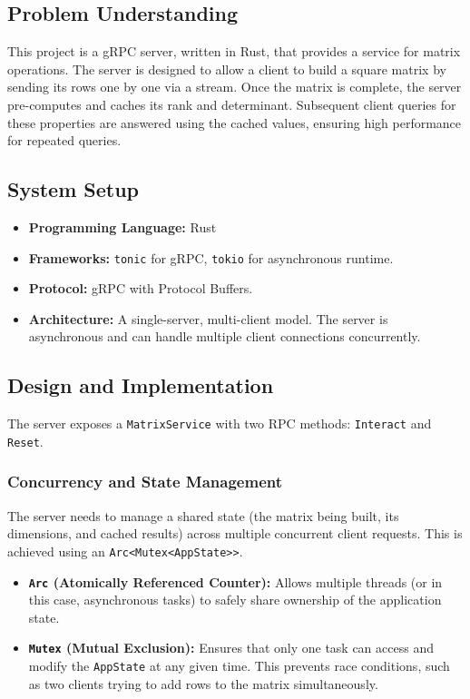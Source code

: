 \documentclass{article}
\begin{document}
\subsection{Problem Understanding}
This project is a gRPC server, written in Rust, that provides a service for matrix operations. The server is designed to allow a client to build a square matrix by sending its rows one by one via a stream. Once the matrix is complete, the server pre-computes and caches its rank and determinant. Subsequent client queries for these properties are answered using the cached values, ensuring high performance for repeated queries.

\subsection{System Setup}
\begin{itemize}
    \item \textbf{Programming Language:} Rust
    \item \textbf{Frameworks:} \texttt{tonic} for gRPC, \texttt{tokio} for asynchronous runtime.
    \item \textbf{Protocol:} gRPC with Protocol Buffers.
    \item \textbf{Architecture:} A single-server, multi-client model. The server is asynchronous and can handle multiple client connections concurrently.
\end{itemize}

\subsection{Design and Implementation}
The server exposes a \texttt{MatrixService} with two RPC methods: \texttt{Interact} and \texttt{Reset}.

\subsubsection{Concurrency and State Management}
The server needs to manage a shared state (the matrix being built, its dimensions, and cached results) across multiple concurrent client requests. This is achieved using an \texttt{Arc<Mutex<AppState>>}.
\begin{itemize}
    \item \textbf{\texttt{Arc} (Atomically Referenced Counter):} Allows multiple threads (or in this case, asynchronous tasks) to safely share ownership of the application state.
    \item \textbf{\texttt{Mutex} (Mutual Exclusion):} Ensures that only one task can access and modify the \texttt{AppState} at any given time. This prevents race conditions, such as two clients trying to add rows to the matrix simultaneously.
\end{itemize}
\end{document}
